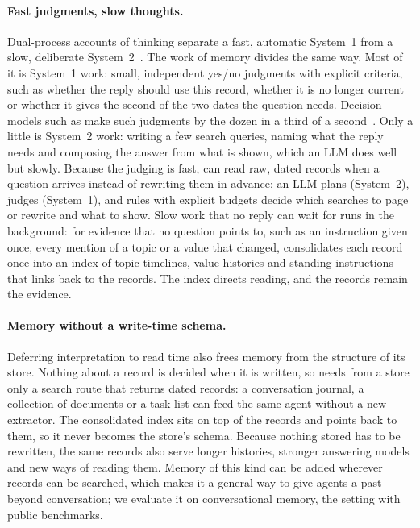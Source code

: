 \paragraph{Fast judgments, slow thoughts.}
Dual-process accounts of thinking separate a fast, automatic System~1 from a slow, deliberate System~2~\citep{kahneman2011thinking}.
The work of memory divides the same way.
Most of it is System~1 work: small, independent yes/no judgments with explicit criteria, such as whether the reply should use this record, whether it is no longer current or whether it gives the second of the two dates the question needs.
Decision models such as \jev{} make such judgments by the dozen in a third of a second~\citep{jev2026}.
Only a little is System~2 work: writing a few search queries, naming what the reply needs and composing the answer from what is shown, which an LLM does well but slowly.
Because the judging is fast, \sys{} can read raw, dated records when a question arrives instead of rewriting them in advance: an LLM plans (System~2), \jev{} judges (System~1), and rules with explicit budgets decide which searches to page or rewrite and what to show.
Slow work that no reply can wait for runs in the background: for evidence that no question points to, such as an instruction given once, every mention of a topic or a value that changed, \sys{} consolidates each record once into an index of topic timelines, value histories and standing instructions that links back to the records.
The index directs reading, and the records remain the evidence.

\paragraph{Memory without a write-time schema.}
Deferring interpretation to read time also frees memory from the structure of its store.
Nothing about a record is decided when it is written, so \sys{} needs from a store only a search route that returns dated records: a conversation journal, a collection of documents or a task list can feed the same agent without a new extractor.
The consolidated index sits on top of the records and points back to them, so it never becomes the store's schema.
Because nothing stored has to be rewritten, the same records also serve longer histories, stronger answering models and new ways of reading them.
Memory of this kind can be added wherever records can be searched, which makes it a general way to give agents a past beyond conversation; we evaluate it on conversational memory, the setting with public benchmarks.

